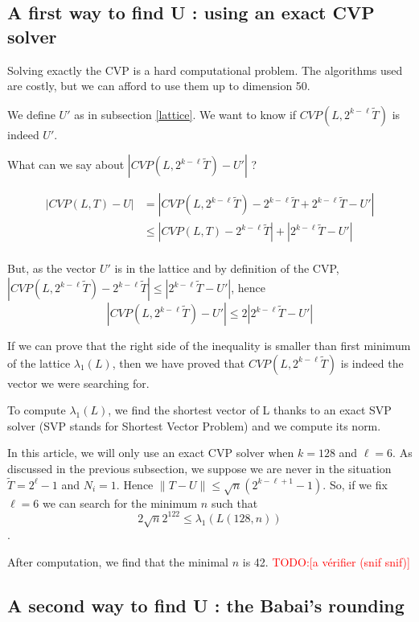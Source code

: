 \documentclass[submission,svgnames,journal=tosc]{iacrtrans}
\newcommand{\todo}[1]{\textcolor{red}{TODO:[#1]}}
\begin{document}
\subsection{A first way to find U : using an exact CVP solver}

Solving exactly the CVP is a hard computational problem. The algorithms used are costly, but we can afford to use them up to dimension 50.

We define \(U'\) as in subsection \ref{lattice}. We want to know if \(CVP(L,2^{k-\ell}\widetilde{T})\) is indeed \(U'\).

What can we say about \(|CVP(L,2^{k-\ell}\widetilde{T})-U'|\) ?

\begin{align*}
|CVP(L,T)-U| &= |CVP(L,2^{k-\ell}\widetilde{T})-2^{k-\ell}\widetilde{T}+2^{k-\ell}\widetilde{T}-U'|\\
& \leqslant |CVP(L,T)-2^{k-\ell}\widetilde{T}|+|2^{k-\ell}\widetilde{T}-U'|\\
\end{align*}

But, as the vector \(U'\) is in the lattice and by definition of the CVP, \(|CVP(L,2^{k-\ell}\widetilde{T})-2^{k-\ell}\widetilde{T}| \leqslant |2^{k-\ell}\widetilde{T}-U'| \), hence 
\[|CVP(L,2^{k-\ell}\widetilde{T})-U'|\leqslant 2|2^{k-\ell}\widetilde{T}-U'|\]

If we can prove that the right side of the inequality is smaller than first minimum of the lattice \(\lambda_1(L)\), then we have proved that \(CVP(L,2^{k-\ell}\widetilde{T})\) is indeed the vector we were searching for.

To compute \(\lambda_1(L)\), we find the shortest vector of L thanks to an exact SVP solver (SVP stands for Shortest Vector Problem) and we compute its norm.


In this article, we will only use an exact CVP solver when \(k = 128\) and \(\ell = 6\). As discussed in the previous subsection, we suppose we are never in the situation\(\widetilde{T} = 2^\ell-1\) and \(N_i=1\). Hence \(\lVert T-U \rVert \leqslant \sqrt{n}(2^{k-\ell+1}-1) \). So, if we fix \(\ell = 6\) we can search for the minimum \(n\) such that \[2\sqrt{n}2^{122} \leqslant \lambda_1(L(128,n))\].

After computation, we find that the minimal \(n\) is 42. \todo{a vérifier (snif snif)}


\subsection{A second way to find U : the Babai's rounding}
\end{document}
